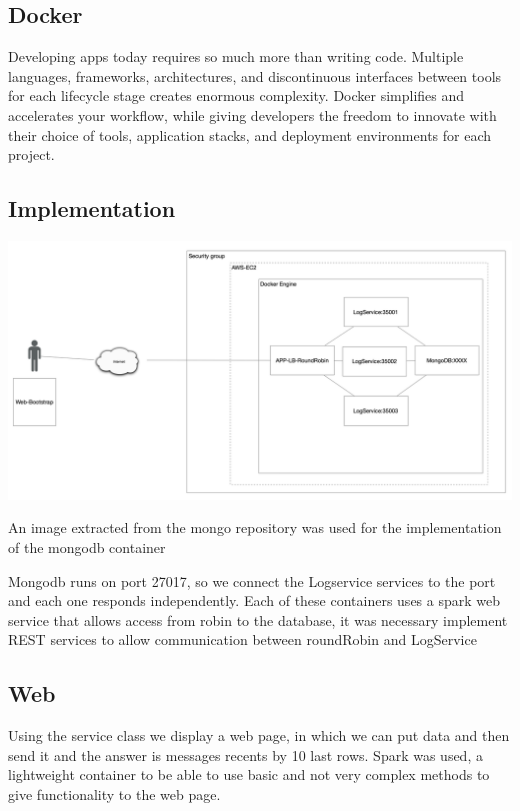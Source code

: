 \documentclass[
	12pt, %
]{fphw}
\begin{document}

\subsection * {Docker}


Developing apps today requires so much more than writing code. Multiple languages, frameworks, architectures, and discontinuous interfaces between tools for each lifecycle stage creates enormous complexity. Docker simplifies and accelerates your workflow, while giving developers the freedom to innovate with their choice of tools, application stacks, and deployment environments for each project.


\subsection * {Implementation}

\includegraphics [scale = 0.28] {download.png}


An image extracted from the mongo repository was used for the implementation of the mongodb container

Mongodb runs on port 27017, so we connect the Logservice services to the port and each one responds independently. Each of these containers uses a spark web service that allows access from robin to the database, it was necessary implement REST services to allow communication between roundRobin and LogService


\subsection * {Web}

Using the service class we display a web page, in which we can put data and then send it and the answer is messages recents by 10 last rows.
Spark was used, a lightweight container to be able to use basic and not very complex methods to give functionality to the web page.
\end{document}
